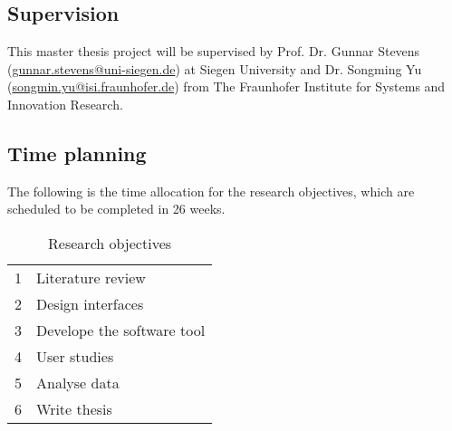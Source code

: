 \subsection{Supervision}

This master thesis project will be supervised by 
Prof. Dr. Gunnar Stevens (\href{mailto:gunnar.stevens@uni-siegen.de}{gunnar.stevens@uni-siegen.de}) at Siegen University and 
Dr. Songming Yu (\href{mailto:songmin.yu@isi.fraunhofer.de}{songmin.yu@isi.fraunhofer.de}) from The Fraunhofer Institute for Systems and Innovation Research. 


\subsection{Time planning}

The following is the time allocation for the research objectives, which are scheduled to be completed in 26 weeks. \\

\begin{table}[h]
  \begin{center}
    \begin{tabular}{ p{} p{} }
      \cellcolor[rgb]{0.94,0.96,0.98}1 & Literature review \\
      \cellcolor[rgb]{0.86,0.90,0.96}2 & Design interfaces\\ 
      \cellcolor[rgb]{0.78,0.84,0.94}3 & Develope the software tool\\
      \cellcolor[rgb]{0.71,0.78,0.92}4 & User studies \\
      \cellcolor[rgb]{0.63,0.73,0.89}5 & Analyse data\\
      \cellcolor[rgb]{0.55,0.67,0.87}6 & Write thesis \\
    \end{tabular}
    \caption{Research objectives}
    \label{tab:objectives}
  \end{center}
\end{table}

